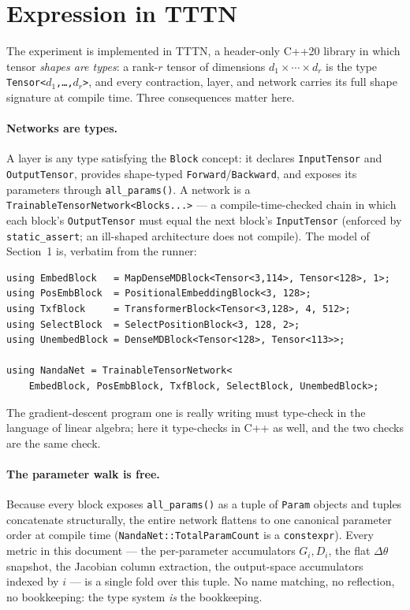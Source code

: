 \documentclass[11pt]{article}
\begin{document}
\section{Expression in TTTN}

The experiment is implemented in TTTN, a header-only C++20 library in which tensor
\emph{shapes are types}: a rank-$r$ tensor of dimensions $d_1 \times \cdots \times d_r$
is the type \texttt{Tensor<$d_1$,\dots,$d_r$>}, and every contraction, layer, and network
carries its full shape signature at compile time. Three consequences matter here.

\paragraph{Networks are types.} A layer is any type satisfying the \texttt{Block} concept:
it declares \texttt{InputTensor} and \texttt{OutputTensor}, provides shape-typed
\texttt{Forward}/\texttt{Backward}, and exposes its parameters through \texttt{all\_params()}.
A network is a \texttt{TrainableTensorNetwork<Blocks...>} --- a compile-time-checked chain in
which each block's \texttt{OutputTensor} must equal the next block's \texttt{InputTensor}
(enforced by \texttt{static\_assert}; an ill-shaped architecture does not compile).
The model of Section~1 is, verbatim from the runner:

\begin{lstlisting}[style=cpp]
using EmbedBlock   = MapDenseMDBlock<Tensor<3,114>, Tensor<128>, 1>;
using PosEmbBlock  = PositionalEmbeddingBlock<3, 128>;
using TxfBlock     = TransformerBlock<Tensor<3,128>, 4, 512>;
using SelectBlock  = SelectPositionBlock<3, 128, 2>;
using UnembedBlock = DenseMDBlock<Tensor<128>, Tensor<113>>;

using NandaNet = TrainableTensorNetwork<
    EmbedBlock, PosEmbBlock, TxfBlock, SelectBlock, UnembedBlock>;
\end{lstlisting}

The gradient-descent program one is really writing must type-check in the language of
linear algebra; here it type-checks in C++ as well, and the two checks are the same check.

\paragraph{The parameter walk is free.} Because every block exposes \texttt{all\_params()}
as a tuple of \texttt{Param} objects and tuples concatenate structurally, the entire network
flattens to one canonical parameter order at compile time
(\texttt{NandaNet::TotalParamCount} is a \texttt{constexpr}). Every metric in this document
--- the per-parameter accumulators $G_i, D_i$, the flat $\Delta\theta$ snapshot, the Jacobian
column extraction, the output-space accumulators indexed by $i$ --- is a single fold over
this tuple. No name matching, no reflection, no bookkeeping: the type system \emph{is} the
bookkeeping.
\end{document}
